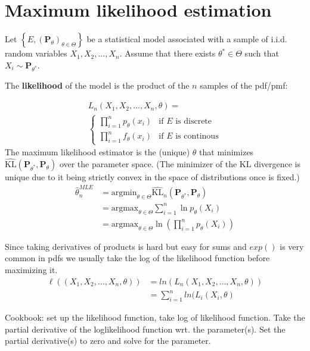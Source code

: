 \section{Maximum likelihood estimation}

Let $\left\{ E,\left(\mathbf{P}_{\theta }\right)_{\theta \in \Theta }\right\}$  be a statistical model associated with a sample of i.i.d. random variables $X_1, X_2, \dots , X_ n$. Assume that there exists $\theta ^* \in \Theta$ such that $X_ i \sim \mathbf{P}_{\theta ^*}$.

The \textbf{likelihood} of the model is the product of the $n$ samples of the pdf/pmf:

\begin{align*}
L_n{(X_1, X_2, \dots , X_ n, \theta)} = \\
{\begin{cases}
    \displaystyle \prod_{i=1}^np_\theta(x_i) & \text{if }E\text{ is discrete} \\
    \displaystyle \prod_{i=1}^nf_\theta(x_i) & \text{if }E\text{ is continous}
\end{cases}}
\end{align*}
The maximum likelihood estimator is the (unique) $\theta$ that minimizes $\widehat{\text {KL}}\left(\mathbf{P}_{\theta ^*}, \mathbf{P}_{\theta }\right)$ over the parameter space. (The minimizer of the KL divergence is unique due to it being strictly convex in the space of distributions once  is fixed.)
\begin{align*}
\widehat{\theta }_ n^{MLE}& = \displaystyle \text {argmin}_{\theta \in \Theta }\widehat{\text {KL}}_ n\left(\mathbf{P}_{\theta ^*}, \mathbf{P}_{\theta }\right)\\
&= \displaystyle \text {argmax}_{\theta \in \Theta } \sum _{i=1}^{n} \ln p_{\theta }(X_ i)\\  
&= \displaystyle \text {argmax}_{\theta \in \Theta } \ln \left(\prod _{i=1}^{n} p_{\theta }(X_ i)\right)
\end{align*}

Since taking derivatives of products is hard but easy for sums and $exp()$ is very common in pdfs we usually take the log of the likelihood function before maximizing it.
\begin{align*}
\ell((X_1, X_2, \dots , X_ n, \theta)) &= ln(L_n{(X_1, X_2, \dots , X_ n, \theta)})\\
 &= \sum_{i=1}^n  ln(L_i(X_i,\theta)
\end{align*}

Cookbook: set up the likelihood function, take log of likelihood function. Take the partial derivative of the loglikelihood function wrt. the parameter(s). Set the partial derivative(s) to zero and solve for the parameter.

